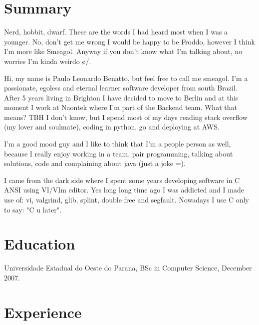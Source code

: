 \documentclass[margin]{res}
\begin{document}
  

\address{Essen, DE \\ benatto@gmail.com \\ Phone: +49 017677556352 \\ Post Code: 45130 }
                           
                        
\begin{resume}
 
\section{Summary}

Nerd, hobbit, dwarf. These are the words I had heard most when I was a younger. No, don't get me wrong I would be happy to be Froddo,
however I think I'm more like Smeagol. Anyway if you don't know what I'm talking about, no worries I'm kinda weirdo \o/.

Hi, my name is Paulo Leonardo Benatto, but feel free to call me smeagol. I'm a passionate, egoless and eternal learner software developer
from south Brazil. After 5 years living in Brighton I have decided to move to Berlin and at this moment I work at Naontek where I'm part
of the Backend team. What that means? TBH I don't know, but I spend most of my days reading stack overflow (my lover and soulmate), coding
in python, go and deploying at AWS.

I'm a good mood guy and I like to think that I'm a people person as well, because I really enjoy working in a team, pair programming,
talking about solutions, code and complaining about java (just a joke =).

I came from the dark side where I spent some years developing software in C ANSI using VI/VIm editor. Yes long long time ago I was
addicted and I made use of: vi, valgrind, glib, splint, double free and segfault. Nowadays I use C only to say: "C u later".
 
\section{Education}	Universidade Estadual do Oeste do Parana, BSc in Computer Science, December 2007.

\section{Experience}



\end{resume}
\end{document}

